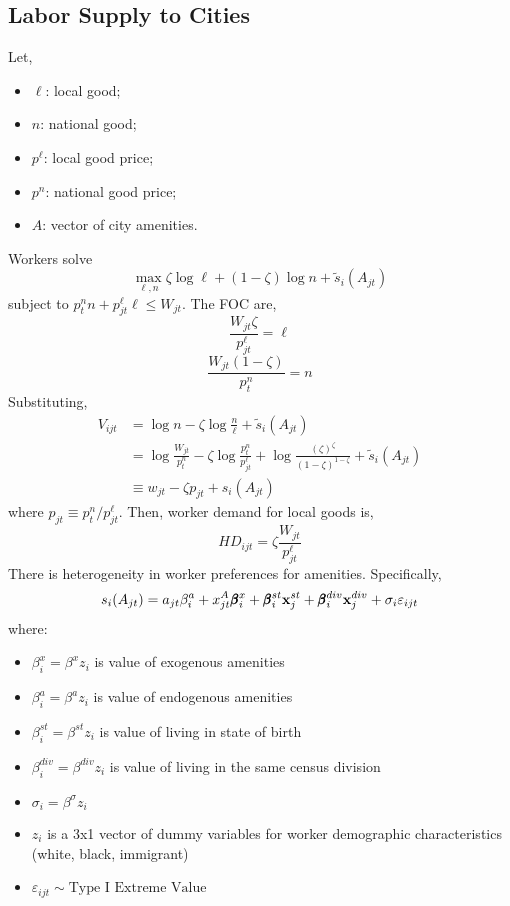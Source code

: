 \documentclass{article}
\begin{document}
\subsection{Labor Supply to Cities}
Let,
\begin{itemize}
    \item $\ell$: local good;
    \item $n$: national good;
    \item $p^\ell$: local good price;
    \item $p^n$: national good price;
    \item $A$: vector of city amenities.
\end{itemize}
Workers solve
$$\max_{\ell,n} \zeta \log \ell + (1-\zeta)\log n + \tilde{s}_i(A_{jt}) $$
subject to $p^n_t n + p^\ell_{jt}\ell\leq W_{jt}$. The FOC are,
$$\frac{W_{jt}\zeta}{p^\ell_{jt}} = \ell$$
$$\frac{W_{jt}(1-\zeta)}{p^n_t} = n$$
Substituting,
\begin{align*}
    V_{ijt} &= \log n - \zeta \log \frac{n}{\ell} + \tilde{s}_i(A_{jt})\\ 
    &= \log \frac{W_{jt}}{p^n_{t}} - \zeta \log\frac{p^n_{t}}{p^\ell_{jt}} + \log\frac{(\zeta)^\zeta}{(1-\zeta)^{1-\zeta}} + \tilde{s}_i(A_{jt}) \\
    &\equiv w_{jt} - \zeta p_{jt} + s_i(A_{jt})
\end{align*}
where $p_{jt} \equiv p_t^n/p_{jt}^\ell$.
Then, worker demand for local goods is,
$$HD_{ijt} = \zeta \frac{W_{jt}}{p^\ell_{jt}}$$
There is heterogeneity in worker preferences for amenities. Specifically,
$$s_i(A_{jt}) = a_{jt}\beta_i^a + x_{jt}^A\pmb{\beta}_i^x + \pmb{\beta}_i^{st}\mathbf{x}_{j}^{st} + \pmb{\beta}_i^{div}\mathbf{x}_j^{div} + \sigma_i\varepsilon_{ijt}$$
where:
\begin{itemize}
    \item $\beta_i^x = \beta^x z_i$ is value of exogenous amenities
    \item $\beta_i^{a} = \beta^{a} z_i$ is value of endogenous amenities
    \item $\beta_i^{st} = \beta^{st} z_i$ is value of living in state of birth
    \item $\beta_i^{div} = \beta^{div} z_i$ is value of living in the same census division
    \item $\sigma_i = \beta^\sigma z_i$
    \item $z_i$ is a 3x1 vector of dummy variables for worker demographic characteristics (white, black, immigrant)
    \item $\varepsilon_{ijt}\sim\text{Type I Extreme Value}$
\end{itemize}
\end{document}
